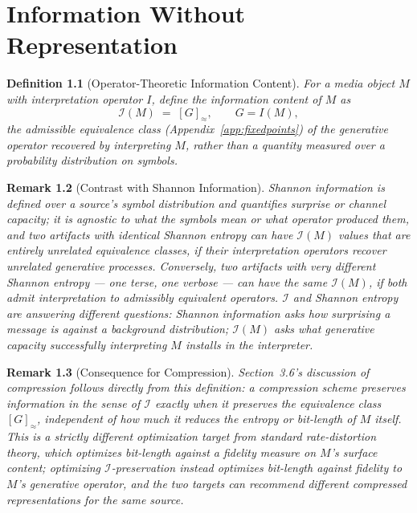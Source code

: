 \documentclass[11pt]{book}
\newtheorem{definition}{Definition}[chapter]
\newtheorem{remark}[definition]{Remark}
\begin{document}
\chapter{Information Without Representation}
\label{app:information}

\begin{definition}[Operator-Theoretic Information Content]
For a media object $M$ with interpretation operator $I$, define the \emph{information content} of $M$ as
\[
\mathcal{I}(M) \;=\; [G]_{\approx}, \qquad G = I(M),
\]
the admissible equivalence class (Appendix~\ref{app:fixedpoints}) of the generative operator recovered by interpreting $M$, rather than a quantity measured over a probability distribution on symbols.
\end{definition}

\begin{remark}[Contrast with Shannon Information]
Shannon information is defined over a source's symbol distribution and quantifies surprise or channel capacity; it is agnostic to what the symbols mean or what operator produced them, and two artifacts with identical Shannon entropy can have $\mathcal{I}(M)$ values that are entirely unrelated equivalence classes, if their interpretation operators recover unrelated generative processes. Conversely, two artifacts with very different Shannon entropy --- one terse, one verbose --- can have the same $\mathcal{I}(M)$, if both admit interpretation to admissibly equivalent operators. $\mathcal{I}$ and Shannon entropy are answering different questions: Shannon information asks how surprising a message is against a background distribution; $\mathcal{I}(M)$ asks what generative capacity successfully interpreting $M$ installs in the interpreter.
\end{remark}

\begin{remark}[Consequence for Compression]
Section~3.6's discussion of compression follows directly from this definition: a compression scheme preserves information in the sense of $\mathcal{I}$ exactly when it preserves the equivalence class $[G]_\approx$, independent of how much it reduces the entropy or bit-length of $M$ itself. This is a strictly different optimization target from standard rate-distortion theory, which optimizes bit-length against a fidelity measure on $M$'s surface content; optimizing $\mathcal{I}$-preservation instead optimizes bit-length against fidelity to $M$'s generative operator, and the two targets can recommend different compressed representations for the same source.
\end{remark}
\end{document}
